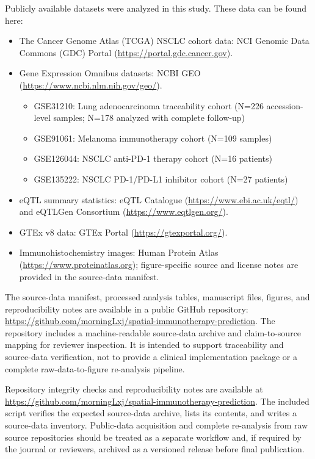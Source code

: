 \documentclass[pdflatex,sn-mathphys-num,referee,lineno]{sn-jnl}
\theoremstyle{thmstyleone}%
\theoremstyle{thmstyletwo}%
\theoremstyle{thmstylethree}%
\begin{document}
Publicly available datasets were analyzed in this study. These data can be found here:
\begin{itemize}
    \item The Cancer Genome Atlas (TCGA) NSCLC cohort data: NCI Genomic Data Commons (GDC) Portal (\url{https://portal.gdc.cancer.gov}).
    \item Gene Expression Omnibus datasets: NCBI GEO \cite{barrettNCBIGEOArchive2012} (\url{https://www.ncbi.nlm.nih.gov/geo/}).
          \begin{itemize}
              \item GSE31210: Lung adenocarcinoma traceability cohort (N=226 accession-level samples; N=178 analyzed with complete follow-up)
              \item GSE91061: Melanoma immunotherapy cohort (N=109 samples)
              \item GSE126044: NSCLC anti-PD-1 therapy cohort (N=16 patients)
              \item GSE135222: NSCLC PD-1/PD-L1 inhibitor cohort (N=27 patients)
          \end{itemize}
    \item eQTL summary statistics: eQTL Catalogue (\url{https://www.ebi.ac.uk/eqtl/}) and eQTLGen Consortium (\url{https://www.eqtlgen.org/}).
    \item GTEx v8 data: GTEx Portal (\url{https://gtexportal.org/}).
    \item Immunohistochemistry images: Human Protein Atlas \cite{uhlenPathologyAtlasHuman2017} (\url{https://www.proteinatlas.org}); figure-specific source and license notes are provided in the source-data manifest.
\end{itemize}

The source-data manifest, processed analysis tables, manuscript files, figures, and reproducibility notes are available in a public GitHub repository: \url{https://github.com/morningLxj/spatial-immunotherapy-prediction}. The repository includes a machine-readable source-data archive and claim-to-source mapping for reviewer inspection. It is intended to support traceability and source-data verification, not to provide a clinical implementation package or a complete raw-data-to-figure re-analysis pipeline.

Repository integrity checks and reproducibility notes are available at \url{https://github.com/morningLxj/spatial-immunotherapy-prediction}. The included script verifies the expected source-data archive, lists its contents, and writes a source-data inventory. Public-data acquisition and complete re-analysis from raw source repositories should be treated as a separate workflow and, if required by the journal or reviewers, archived as a versioned release before final publication.
\end{document}
